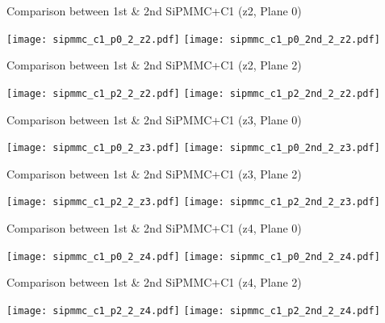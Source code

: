 \documentclass{beamer}
\begin{document}
\begin{frame}{Comparison between 1st \& 2nd SiPMMC+C1 (z2, Plane 0)}
\begin{adjustwidth}{-1.5em}{-1.5em}
	\texttt{[image: sipmmc\_c1\_p0\_2\_z2.pdf]}
	\texttt{[image: sipmmc\_c1\_p0\_2nd\_2\_z2.pdf]}
\end{adjustwidth}
\end{frame}

\begin{frame}{Comparison between 1st \& 2nd SiPMMC+C1 (z2, Plane 2)}
\begin{adjustwidth}{-1.5em}{-1.5em}
	\texttt{[image: sipmmc\_c1\_p2\_2\_z2.pdf]}
	\texttt{[image: sipmmc\_c1\_p2\_2nd\_2\_z2.pdf]}
\end{adjustwidth}
\end{frame}

\begin{frame}{Comparison between 1st \& 2nd SiPMMC+C1 (z3, Plane 0)}
\begin{adjustwidth}{-1.5em}{-1.5em}
	\texttt{[image: sipmmc\_c1\_p0\_2\_z3.pdf]}
	\texttt{[image: sipmmc\_c1\_p0\_2nd\_2\_z3.pdf]}
\end{adjustwidth}
\end{frame}

\begin{frame}{Comparison between 1st \& 2nd SiPMMC+C1 (z3, Plane 2)}
\begin{adjustwidth}{-1.5em}{-1.5em}
	\texttt{[image: sipmmc\_c1\_p2\_2\_z3.pdf]}
	\texttt{[image: sipmmc\_c1\_p2\_2nd\_2\_z3.pdf]}
\end{adjustwidth}
\end{frame}

\begin{frame}{Comparison between 1st \& 2nd SiPMMC+C1 (z4, Plane 0)}
\begin{adjustwidth}{-1.5em}{-1.5em}
	\texttt{[image: sipmmc\_c1\_p0\_2\_z4.pdf]}
	\texttt{[image: sipmmc\_c1\_p0\_2nd\_2\_z4.pdf]}
\end{adjustwidth}
\end{frame}

\begin{frame}{Comparison between 1st \& 2nd SiPMMC+C1 (z4, Plane 2)}
\begin{adjustwidth}{-1.5em}{-1.5em}
	\texttt{[image: sipmmc\_c1\_p2\_2\_z4.pdf]}
	\texttt{[image: sipmmc\_c1\_p2\_2nd\_2\_z4.pdf]}
\end{adjustwidth}
\end{frame}
\end{document}
